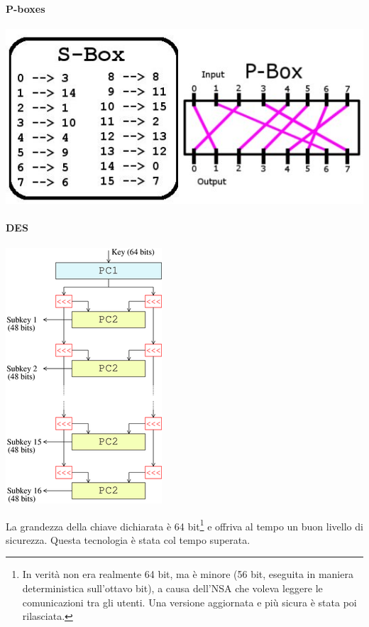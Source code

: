 \paragraph{P-boxes}

\begin{center}
  \includegraphics[scale=0.3]{res/img/pboxes.png}
  \label{fig:password:pboxes}
\end{center}


\paragraph{DES}

\begin{center}
  \includegraphics[scale=0.5]{res/img/des.png}
\label{fig:password:des}
\end{center}

La grandezza della chiave dichiarata è 64 bit\footnote{In verità non era 
realmente 64 bit, ma è minore (56 bit, eseguita in maniera deterministica 
sull'ottavo bit), a causa dell'NSA che voleva leggere le comunicazioni tra gli 
utenti. Una versione aggiornata e più sicura è stata poi rilasciata.} e offriva 
al tempo un buon livello di sicurezza. Questa tecnologia è stata col tempo 
superata.

